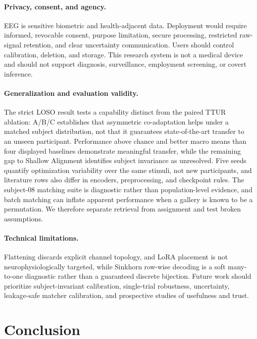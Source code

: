 \documentclass{article}
\begin{document}
\paragraph{Privacy, consent, and agency.}
EEG is sensitive biometric and health-adjacent data. Deployment would require informed, revocable consent, purpose limitation, secure processing, restricted raw-signal retention, and clear uncertainty communication. Users should control calibration, deletion, and storage. This research system is not a medical device and should not support diagnosis, surveillance, employment screening, or covert inference.

\paragraph{Generalization and evaluation validity.}
The strict LOSO result tests a capability distinct from the paired TTUR ablation: A/B/C establishes that asymmetric co-adaptation helps under a matched subject distribution, not that it guarantees state-of-the-art transfer to an unseen participant. Performance above chance and better macro means than four displayed baselines demonstrate meaningful transfer, while the remaining gap to Shallow Alignment identifies subject invariance as unresolved. Five seeds quantify optimization variability over the same stimuli, not new participants, and literature rows also differ in encoders, preprocessing, and checkpoint rules. The subject-08 matching suite is diagnostic rather than population-level evidence, and batch matching can inflate apparent performance when a gallery is known to be a permutation. We therefore separate retrieval from assignment and test broken assumptions.

\paragraph{Technical limitations.}
Flattening discards explicit channel topology, and LoRA placement is not neurophysiologically targeted, while Sinkhorn row-wise decoding is a soft many-to-one diagnostic rather than a guaranteed discrete bijection. Future work should prioritize subject-invariant calibration, single-trial robustness, uncertainty, leakage-safe matcher calibration, and prospective studies of usefulness and trust.

\section{Conclusion}
\label{sec:conclusion}
\end{document}
